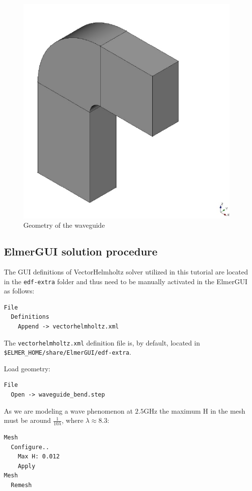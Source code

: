\begin{figure}
\centering
\includegraphics{geom.pdf}
\caption{Geometry of the waveguide}
\label{fig:geometry}
\end{figure}

\subsection*{ElmerGUI solution procedure}

The GUI definitions of VectorHelmholtz solver utilized in this tutorial are located in the \texttt{edf-extra} folder and thus need to be manually activated
in the ElmerGUI as follows:

\begin{verbatim}
File
  Definitions
    Append -> vectorhelmholtz.xml
\end{verbatim}

The \texttt{vectorhelmholtz.xml} definition file is, by default, located in\\
\texttt{\$ELMER\_HOME/share/ElmerGUI/edf-extra}.

Load geometry:
\begin{verbatim}
File
  Open -> waveguide_bend.step
\end{verbatim}

As we are modeling a wave phenomenon at $2.5 \mathrm{GHz}$ the
maximum H in the mesh must be around $\frac 1 {10\lambda}$, where
$\lambda\approx8.3$:
\begin{verbatim}
Mesh
  Configure..
    Max H: 0.012
    Apply
Mesh
  Remesh
\end{verbatim}

